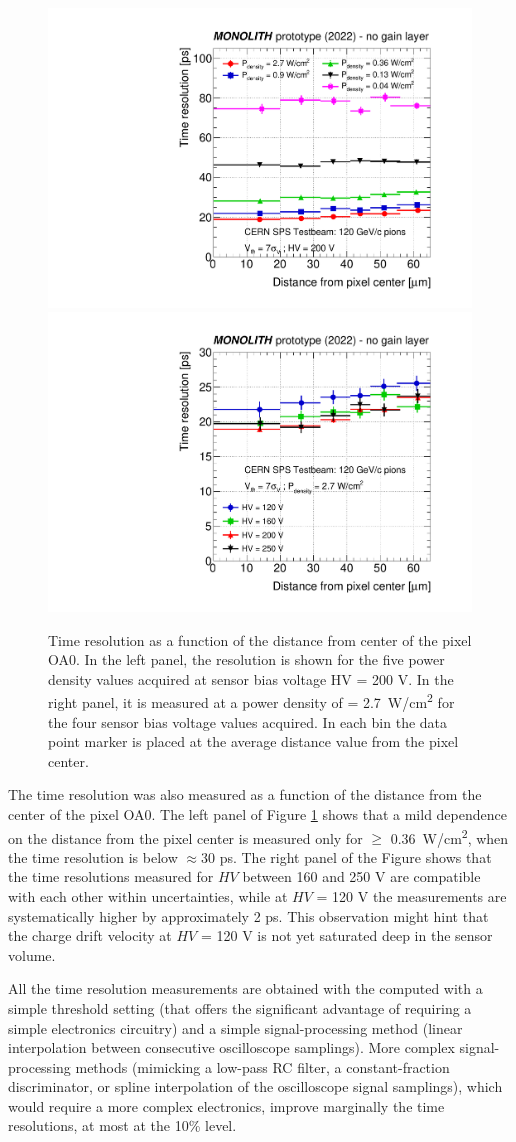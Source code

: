 		\begin{figure}[h]
			\centering %
			\includegraphics[width=.49\linewidth]{files/MONOLITH_paper/timeres_vs_radius_allWP.pdf}
			\includegraphics[width=.49\linewidth]{files/MONOLITH_paper/timeres_vs_radius_allHV.pdf}
			\caption{Time resolution as a function of the distance from center of the pixel OA0. In the left panel, the resolution is shown for the five power density values acquired at sensor bias voltage HV = 200 V. In the right panel, it is measured at a power density of \power = \SI{2.7}{\watt/\centi\meter^2} for the four sensor bias voltage values acquired. In each  bin the data point marker is placed at the average distance value from the pixel center.}
			\label{im:MONO_TOF_radius} 
		\end{figure}


		The time resolution was also measured as a function of the distance from the center of the pixel OA0. The left panel of Figure \ref{im:MONO_TOF_radius} shows that a mild dependence on the distance from the pixel center is measured only for \power $\ge$ \SI{0.36}{\watt/\centi\meter^2}, when the time resolution is below $\approx$30 ps. The right panel of the Figure shows that the time resolutions measured for $HV$ between 160 and 250 V are compatible with each other within uncertainties, while at $HV$ = 120 V the measurements are systematically higher by approximately 2 ps. This observation might hint that the charge drift velocity at $HV$ = 120 V is not yet saturated deep in the sensor volume.

		All the time resolution measurements are obtained with the \toa computed with a simple threshold setting (that offers the significant advantage of requiring a simple electronics circuitry) and a simple signal-processing method (linear interpolation between consecutive oscilloscope samplings).
		More complex signal-processing methods (mimicking a low-pass RC filter, a constant-fraction discriminator, or spline interpolation of the oscilloscope signal samplings), which would require a more complex electronics, improve marginally the time resolutions, at most at the 10\% level.


